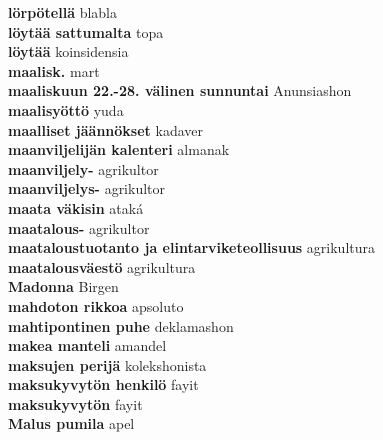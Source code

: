 \textbf{ lörpötellä  } blabla \\
\textbf{ löytää sattumalta  } topa \\
\textbf{ löytää  } koinsidensia \\
\textbf{ maalisk.  } mart \\
\textbf{ maaliskuun 22.-28. välinen sunnuntai  } Anunsiashon \\
\textbf{ maalisyöttö  } yuda \\
\textbf{ maalliset jäännökset  } kadaver \\
\textbf{ maanviljelijän kalenteri  } almanak \\
\textbf{ maanviljely-  } agrikultor \\
\textbf{ maanviljelys-  } agrikultor \\
\textbf{ maata väkisin  } ataká \\
\textbf{ maatalous-  } agrikultor \\
\textbf{ maataloustuotanto ja elintarviketeollisuus  } agrikultura \\
\textbf{ maatalousväestö  } agrikultura \\
\textbf{ Madonna  } Birgen \\
\textbf{ mahdoton  rikkoa  } apsoluto \\
\textbf{ mahtipontinen puhe  } deklamashon \\
\textbf{ makea manteli  } amandel \\
\textbf{ maksujen perijä  } kolekshonista \\
\textbf{ maksukyvytön henkilö  } fayit \\
\textbf{ maksukyvytön  } fayit \\
\textbf{ Malus pumila  } apel \\
